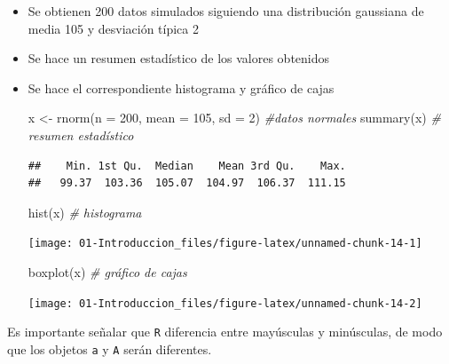 \documentclass[
]{book}
\newenvironment{Shaded}{\begin{snugshade}}{\end{snugshade}}
\newcommand{\AttributeTok}[1]{\textcolor[rgb]{0.77,0.63,0.00}{#1}}
\newcommand{\CommentTok}[1]{\textcolor[rgb]{0.56,0.35,0.01}{\textit{#1}}}
\newcommand{\DecValTok}[1]{\textcolor[rgb]{0.00,0.00,0.81}{#1}}
\newcommand{\FunctionTok}[1]{\textcolor[rgb]{0.00,0.00,0.00}{#1}}
\newcommand{\NormalTok}[1]{#1}
\newcommand{\OtherTok}[1]{\textcolor[rgb]{0.56,0.35,0.01}{#1}}
\theoremstyle{break}
\begin{document}
\begin{itemize}
\item
  Se obtienen 200 datos simulados siguiendo una distribución gaussiana
  de media 105 y desviación típica 2
\item
  Se hace un resumen estadístico de los valores obtenidos
\item
  Se hace el correspondiente histograma y gráfico de cajas

\begin{Shaded}
\begin{Highlighting}[]
\NormalTok{x }\OtherTok{\textless{}{-}} \FunctionTok{rnorm}\NormalTok{(}\AttributeTok{n =} \DecValTok{200}\NormalTok{, }\AttributeTok{mean =} \DecValTok{105}\NormalTok{, }\AttributeTok{sd =} \DecValTok{2}\NormalTok{) }\CommentTok{\#datos normales}
\FunctionTok{summary}\NormalTok{(x) }\CommentTok{\# resumen estadístico}
\end{Highlighting}
\end{Shaded}

\begin{verbatim}
##    Min. 1st Qu.  Median    Mean 3rd Qu.    Max. 
##   99.37  103.36  105.07  104.97  106.37  111.15
\end{verbatim}

\begin{Shaded}
\begin{Highlighting}[]
\FunctionTok{hist}\NormalTok{(x) }\CommentTok{\# histograma}
\end{Highlighting}
\end{Shaded}

  \begin{center}\texttt{[image: 01-Introduccion\_files/figure-latex/unnamed-chunk-14-1]} \end{center}

\begin{Shaded}
\begin{Highlighting}[]
\FunctionTok{boxplot}\NormalTok{(x) }\CommentTok{\# gráfico de cajas}
\end{Highlighting}
\end{Shaded}

  \begin{center}\texttt{[image: 01-Introduccion\_files/figure-latex/unnamed-chunk-14-2]} \end{center}
\end{itemize}

Es importante señalar que \texttt{R} diferencia entre mayúsculas y
minúsculas, de modo que los objetos \texttt{a} y \texttt{A} serán diferentes.
\end{document}
